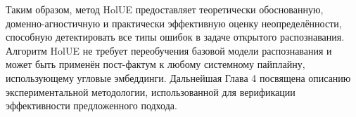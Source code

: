 







Таким образом, метод HolUE предоставляет теоретически обоснованную, доменно-агностичную и практически эффективную оценку неопределённости, способную детектировать все типы ошибок в задаче открытого распознавания.  
Алгоритм HolUE не требует переобучения базовой модели распознавания и может быть применён пост-фактум к любому системному пайплайну, использующему угловые эмбеддинги.  
Дальнейшая Глава 4 посвящена описанию экспериментальной методологии, использованной для верификации эффективности предложенного подхода.